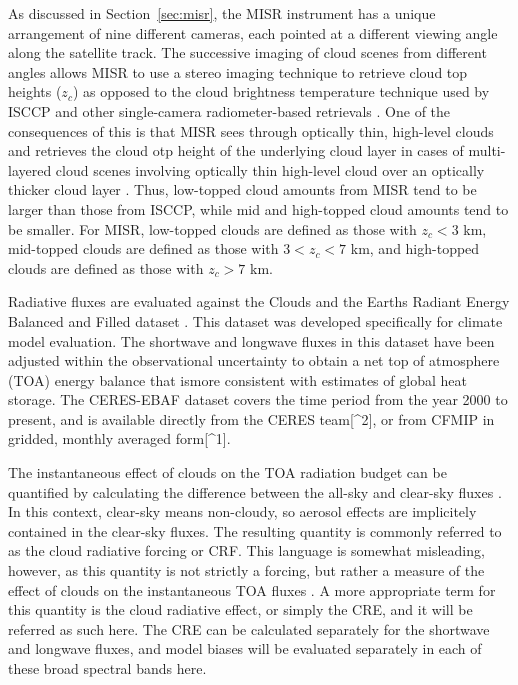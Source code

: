 As discussed in Section~\ref{sec:misr}, the MISR instrument has a unique
arrangement of nine different cameras, each pointed at a different
viewing angle along the satellite track. The successive imaging of cloud
scenes from different angles allows MISR to use a stereo imaging
technique to retrieve cloud top heights (\(z_c\)) as opposed to the
cloud brightness temperature technique used by ISCCP and other
single-camera radiometer-based retrievals
\citep{moroney_et_al_2002, muller_et_al_2002}. One of the consequences
of this is that MISR sees through optically thin, high-level clouds and
retrieves the cloud otp height of the underlying cloud layer in cases of
multi-layered cloud scenes involving optically thin high-level cloud
over an optically thicker cloud layer \citep{marchand_et_al_2010}. Thus,
low-topped cloud amounts from MISR tend to be larger than those from
ISCCP, while mid and high-topped cloud amounts tend to be smaller. For
MISR, low-topped clouds are defined as those with \(z_c < 3\) km,
mid-topped clouds are defined as those with \(3 < z_c < 7\) km, and
high-topped clouds are defined as those with \(z_c > 7\) km.

Radiative fluxes are evaluated against the Clouds and the Earths Radiant
Energy Balanced and Filled dataset \citep[CERES-EBAF Version
2.6;][]{loeb_et_al_2009}. This dataset was developed specifically for
climate model evaluation. The shortwave and longwave fluxes in this
dataset have been adjusted within the observational uncertainty to
obtain a net top of atmosphere (TOA) energy balance that ismore
consistent with estimates of global heat storage. The CERES-EBAF dataset
covers the time period from the year 2000 to present, and is available
directly from the CERES team{[}\^{}2{]}, or from CFMIP in gridded,
monthly averaged form{[}\^{}1{]}.

The instantaneous effect of clouds on the TOA radiation budget can be
quantified by calculating the difference between the all-sky and
clear-sky fluxes
\citep[e.g.,][]{ellis_and_vonderhaar_1976, ramanathan_1987, ramanathan_et_al_1989}.
In this context, clear-sky means non-cloudy, so aerosol effects are
implicitely contained in the clear-sky fluxes. The resulting quantity is
commonly referred to as the cloud radiative forcing or CRF. This
language is somewhat misleading, however, as this quantity is not
strictly a forcing, but rather a measure of the effect of clouds on the
instantaneous TOA fluxes \citep{stephens_2005}. A more appropriate term
for this quantity is the cloud radiative effect, or simply the CRE, and
it will be referred as such here. The CRE can be calculated separately
for the shortwave and longwave fluxes, and model biases will be
evaluated separately in each of these broad spectral bands here.

